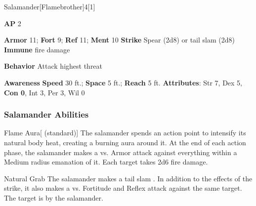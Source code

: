 \begin{monsection}{Salamander}[Flamebrother]{4}[1]
\vspace{-1em}\vspace{-1em}
\begin{spellcontent}
\begin{spelltargetinginfo}
{\textbf{AP} 2}

\pari \textbf{Armor} 11;
\textbf{Fort} 9;
\textbf{Ref} 11;
\textbf{Ment} 10
\pari \textbf{Strike} Spear  (2d8) or tail slam  (2d8)
\pari \textbf{Immune} fire damage


\pari \textbf{Behavior} Attack highest threat
\end{spelltargetinginfo}
\end{spellcontent}

\begin{monsterfooter}
\pari \textbf{Awareness} 
\pari \textbf{Speed} 30 ft.;
\textbf{Space} 5 ft.;
\textbf{Reach} 5 ft.
\pari \textbf{Attributes}:
Str 7,
Dex 5,
\textbf{Con 0},
Int 3,
Per 3,
Wil 0
\end{monsterfooter}
\end{monsection}


\subsubsection{Salamander Abilities}

\begin{ability}{Flame Aura}[ (standard)]
The salamander spends an action point to intensify its natural body heat, creating a burning aura around it.
At the end of each action phase, the salamander makes a  vs. Armor
attack against everything within a Medium radius emanation of it.
\hit Each target takes 2d6 fire damage.
\end{ability}

\vspace{0.5em}
\begin{ability}{Natural Grab}
The salamander makes a tail slam .
In addition to the effects of the strike, it also makes a  vs. Fortitude and Reflex attack against the same target.
\hit The target is  by the salamander.
\end{ability}

